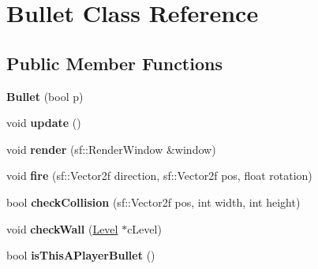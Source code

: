 \hypertarget{class_bullet}{}\section{Bullet Class Reference}
\label{class_bullet}
\subsection*{Public Member Functions}
\begin{DoxyCompactItemize}
\item 
\mbox{\label{class_bullet_a99bd9e1832de4538965f975ba60a2a20}} 
{\bfseries Bullet} (bool p)
\item 
\mbox{\label{class_bullet_a32f4a0611fe2dd245fee955d14ca1f68}} 
void {\bfseries update} ()
\item 
\mbox{\label{class_bullet_acea71a980a81ac7da86099d2aa9d433c}} 
void {\bfseries render} (sf\+::\+Render\+Window \&window)
\item 
\mbox{\label{class_bullet_a2d6ac5a3681211a7269278673b186db3}} 
void {\bfseries fire} (sf\+::\+Vector2f direction, sf\+::\+Vector2f pos, float rotation)
\item 
\mbox{\label{class_bullet_acc80c63dde919529a48c3a2531e6e0b4}} 
bool {\bfseries check\+Collision} (sf\+::\+Vector2f pos, int width, int height)
\item 
\mbox{\label{class_bullet_a4392168566f9f8e2f29fb3edc5b245cf}} 
void {\bfseries check\+Wall} (\mbox{\hyperlink{class_level}{Level}} $\ast$c\+Level)
\item 
\mbox{\label{class_bullet_a5aed0d8dd06563d403bea44cc953b8ae}} 
bool {\bfseries is\+This\+A\+Player\+Bullet} ()
\end{DoxyCompactItemize}
